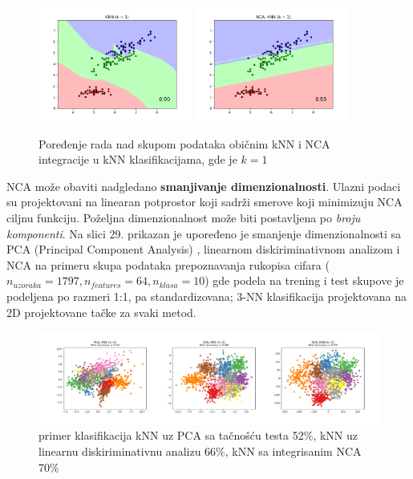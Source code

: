 \documentclass[fontsize=12bp, paper=a4]{scrarticle}
\begin{document}
\begin{figure}[h!]
    \centering
    \includegraphics[width=0.45\textwidth]{image-31.png}
    \includegraphics[width=0.45\textwidth]{image-30.png}
    \caption{\centering Poređenje rada nad skupom podataka običnim kNN i NCA integracije u kNN klasifikacijama, gde je $k = 1$}
\end{figure}

NCA može obaviti nadgledano \textbf{smanjivanje dimenzionalnosti}. Ulazni podaci su projektovani na linearan potprostor koji sadrži smerove koji minimizuju NCA ciljnu funkciju. Poželjna dimenzionalnost može biti postavljena po \textit{broju komponenti}. Na slici 29. prikazan je upoređeno je smanjenje dimenzionalnosti sa PCA (Principal Component Analysis)
, linearnom diskiriminativnom analizom i NCA na primeru skupa podataka prepoznavanja rukopisa cifara ($n_{uzoraka} = 1797, n_{features}=64, n_{klasa} = 10$) gde podela na trening i test skupove je podeljena po razmeri 1:1, pa standardizovana; 3-NN klasifikacija projektovana na 2D projektovane tačke za svaki metod.

\begin{figure}[h!]
    \centering
    \includegraphics[width=1\textwidth]{image-32.png}
    \caption{\centering primer klasifikacija kNN uz PCA sa tačnošću testa 52\%, kNN uz linearnu diskiriminativnu analizu 66\%, kNN sa integrisanim NCA 70\%}
\end{figure}
\end{document}
